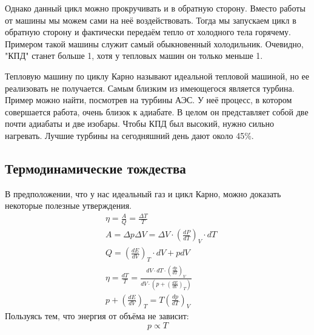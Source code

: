 \documentclass[a4paper, 12pt]{article}
\begin{document}
	Однако данный цикл можно прокручивать и в обратную сторону. Вместо работы от машины мы можем сами на неё воздействовать. Тогда мы запускаем цикл в обратную сторону и фактически передаём тепло от холодного тела горячему. Примером такой машины служит самый обыкновенный холодильник. Очевидно, "КПД" станет больше 1, хотя у тепловых машин он только меньше 1. 
	
	Тепловую машину по циклу Карно называют идеальной тепловой машиной, но ее реализовать не получается. Самым близким из имеющегося является турбина. Пример можно найти, посмотрев на турбины АЭС. У неё процесс, в котором совершается работа, очень близок к адиабате. В целом он представляет собой две почти адиабаты и две изобары. Чтобы КПД был высокий, нужно сильно нагревать. Лучшие турбины на сегодняшний день дают около 45\%.  
	\subsection{Термодинамические тождества}
	В предположении, что у нас идеальный газ и цикл Карно, можно доказать некоторые полезные утверждения.
	\begin{equation*}
		\begin{aligned}
			& \eta = \frac{A}{Q} = \frac{\Delta T}{T}                                                                        \\
			& A = \Delta p \Delta V = \Delta V \cdot (\frac{dP}{dT})_{V} \cdot  dT                                           \\
			& Q = (\frac{dE}{dV})_{T} \cdot dV+pdV                                                                           \\
			& \eta = \frac{dT}{T} = \frac{ dV \cdot dT \cdot (\frac{dp}{dT})_{V}  }{ dV \cdot ( p + (\frac{dE}{dV})_{T} )  } \\
			& p+(\frac{dE}{dV}) _{T}= T (\frac{dp}{dT})_{V}                                                                  
		\end{aligned}
	\end{equation*}
	Пользуясь тем, что энергия от объёма не зависит:
	\begin{equation*}
		p \propto T
	\end{equation*}
\end{document}

